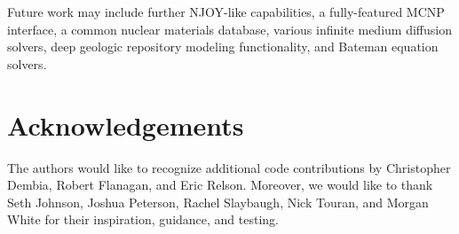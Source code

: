 \documentclass{anstrans}
\begin{document}
Future work may include further NJOY-like capabilities, a fully-featured MCNP
interface, a common nuclear materials database, various infinite medium
diffusion solvers, deep geologic repository modeling functionality, and Bateman
equation solvers.

\section*{Acknowledgements}
The authors would like to recognize additional code contributions by Christopher
Dembia, Robert Flanagan, and Eric Relson.  Moreover, we would like to thank Seth
Johnson, Joshua Peterson, Rachel Slaybaugh, Nick Touran, and Morgan White for
their inspiration, guidance, and testing.


\nocite{*}


\end{document}
